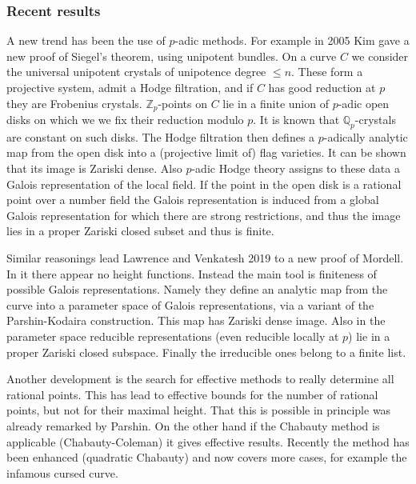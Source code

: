\documentclass{beamer}
\begin{document}
\begin{frame}
\frametitle{Recent results}
A new trend has been the use of $p$-adic methods. For example in 2005 Kim gave a new proof of Siegel's theorem, using unipotent bundles. On a curve $C$ we consider the universal unipotent crystals of unipotence degree $\le n$. These form a projective system,  admit a Hodge filtration, and if $C$ has good reduction at $p$ they are Frobenius crystals. $\mathbb{Z}_p$-points on $C$ lie in a finite union of $p$-adic open disks on which we we fix their reduction modulo $p$. It is known that $\mathbb{Q}_p$-crystals are constant on such disks. The Hodge filtration then defines a $p$-adically analytic map from the open disk into a (projective limit of) flag varieties. It can be shown that its image is Zariski dense. Also $p$-adic Hodge theory assigns to these data a Galois representation of the local field. If the point in the open disk is a rational point over a number field the Galois representation is induced from a global Galois representation for which there are strong restrictions, and thus the image lies in a  proper Zariski closed subset and thus is finite.
\end{frame}
\begin{frame}

Similar reasonings lead Lawrence and Venkatesh  2019 to a new proof of Mordell.  In it there appear no height functions. Instead the main tool is finiteness of possible Galois representations. Namely they define an analytic map from the curve into a parameter space of Galois representations, via a variant of the Parshin-Kodaira construction. This map has Zariski dense image. Also in the parameter space reducible representations (even reducible locally at $p$) lie in a proper Zariski closed subspace.  Finally the irreducible ones belong to a finite list.

Another development is the search for effective methods to really determine all rational points. This has lead to effective bounds for the number of rational points, but not for their maximal height.  That this is possible in principle was already remarked by Parshin. On the other hand if the Chabauty method is applicable (Chabauty-Coleman) it gives effective results. Recently the method has been enhanced (quadratic Chabauty) and now covers more cases, for example the infamous cursed curve.

\end{frame}
\end{document}
